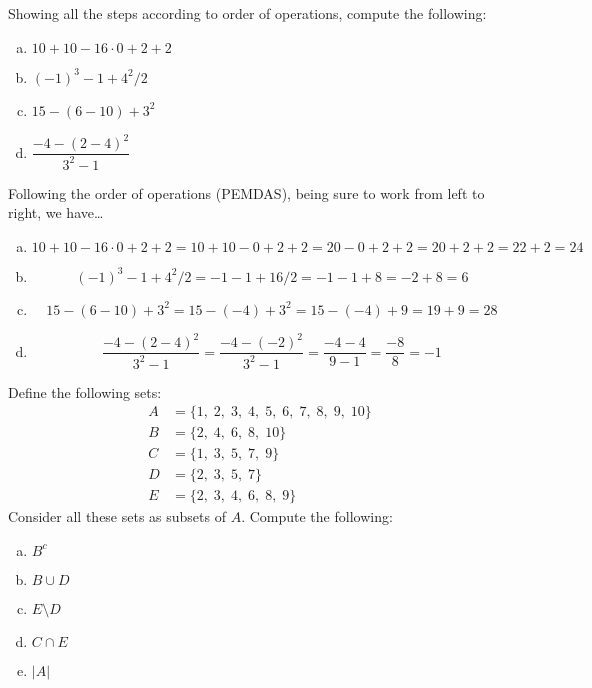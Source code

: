 \documentclass[11pt,letterpaper]{article}
\begin{document}

 Showing all the steps according to order of operations, compute the following:
	\begin{enumerate}[(a)]
	\item $10 + 10 - 16 \cdot 0 + 2 + 2$
	\item $(-1)^3 - 1 + 4^2/2$
	\item $15 - (6 - 10) + 3^2$
	\item $\dfrac{-4 - (2 - 4)^2}{3^2 - 1}$
	\end{enumerate} \pspace

\sol Following the order of operations (PEMDAS), being sure to work from left to right, we have\dots
\begin{enumerate}[(a)] 
\item 
	\[
	10 + 10 - 16 \cdot 0 + 2 + 2= 10 + 10 - 0 + 2 + 2= 20 - 0 + 2 + 2= 20 + 2 + 2= 22 + 2= 24
	\] \pspace

\item 
	\[
	(-1)^3 - 1 + 4^2/2= -1 - 1 + 16/2= -1 - 1 + 8= -2 + 8= 6
	\] \pspace

\item 
	\[
	15 - (6 - 10) + 3^2= 15 - (-4) + 3^2= 15 - (-4) + 9= 19 + 9= 28
	\] \pspace

\item 
	\[
	\dfrac{-4 - (2 - 4)^2}{3^2 - 1}= \dfrac{-4 - (-2)^2}{3^2 - 1}= \dfrac{-4 - 4}{9 - 1}= \dfrac{-8}{8}= -1
	\]
\end{enumerate}



\newpage



 Define the following sets:
	\[
	\begin{aligned}
	A&= \{ 1,\; 2, \; 3,\; 4,\; 5,\; 6,\; 7,\; 8,\; 9,\; 10 \} \\
	B&= \{ 2,\; 4,\; 6,\; 8,\; 10 \} \\
	C&= \{ 1,\; 3,\; 5,\; 7,\; 9 \} \\
	D&= \{ 2,\; 3,\; 5,\; 7 \} \\
	E&= \{ 2,\; 3,\; 4,\; 6,\; 8,\; 9 \}
	\end{aligned}
	\]
Consider all these sets as subsets of $A$. Compute the following:
	\begin{enumerate}[(a)]
	\item $B^c$
	\item $B \cup D$
	\item $E \setminus D$
	\item $C \cap E$
	\item $|A|$
	\end{enumerate} \pspace
\end{document}
